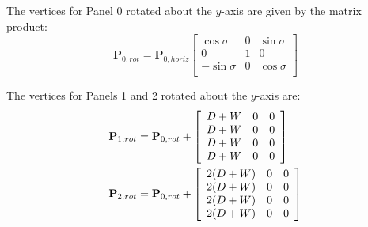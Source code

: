 \documentclass[12pt,letterpaper]{article}
\begin{document}
The vertices for Panel 0 rotated about the $y$-axis are given by the matrix product:
\begin{equation}
  \mathbf{P}_{0,rot} =
  \mathbf{P}_{0,horiz}
  \left[
    \begin{array}{ccc}
      \cos\sigma&0&\sin\sigma\\
      0&1&0\\
      -\sin\sigma&0&\cos\sigma\\
    \end{array}
  \right]
\end{equation}

The vertices for Panels 1 and 2 rotated about the $y$-axis are:
\begin{align}
  \mathbf{P}_{1,rot} &=
  \mathbf{P}_{0,rot}+
  \left [
    \begin{array}{ccc}
      D+W&0&0\\
      D+W&0&0\\
      D+W&0&0\\
      D+W&0&0\\
    \end{array}
  \right]
\notag\\
  \mathbf{P}_{2,rot} &=
  \mathbf{P}_{0,rot}+
  \left [
    \begin{array}{ccc}
      2(D+W)&0&0\\
      2(D+W)&0&0\\
      2(D+W)&0&0\\
      2(D+W)&0&0\\
    \end{array}
  \right]
\end{align}
\end{document}
